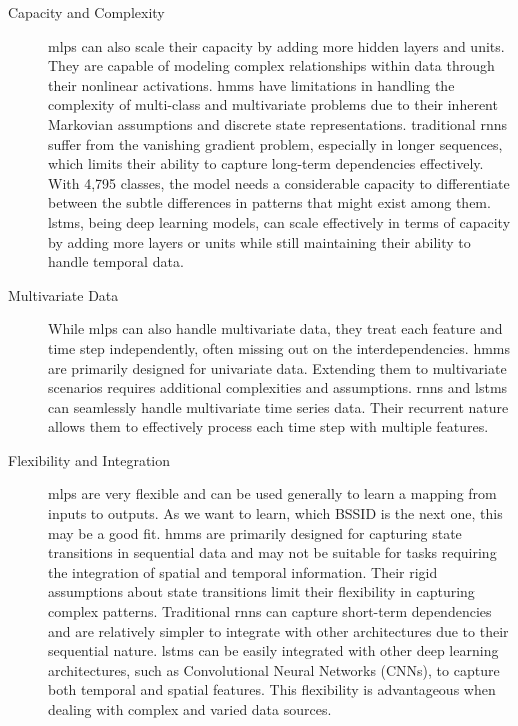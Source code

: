 \begin{description}
\item[Capacity and Complexity]
\acp{mlp} can also scale their capacity by adding more hidden layers and units. They are capable of modeling complex relationships within data through their nonlinear activations.
\acp{hmm} have limitations in handling the complexity of multi-class and multivariate problems due to their inherent Markovian assumptions and discrete state representations.
traditional \acp{rnn} suffer from the vanishing gradient problem, especially in longer sequences, which limits their ability to capture long-term dependencies effectively. \cite{rnn_difficulties_2013}
With 4,795 classes, the model needs a considerable capacity to differentiate between the subtle differences in patterns that might exist among them. \acp{lstm}, being deep learning models, can scale effectively in terms of capacity by adding more layers or units while still maintaining their ability to handle temporal data.
\end{description}

\begin{description}
\item [Multivariate Data]
While \acp{mlp} can also handle multivariate data, they treat each feature and time step independently, often missing out on the interdependencies.
\acp{hmm} are primarily designed for univariate data. Extending them to multivariate scenarios requires additional complexities and assumptions.
\acp{rnn} and \acp{lstm} can seamlessly handle multivariate time series data. Their recurrent nature allows them to effectively process each time step with multiple features.
\end{description}

\begin{description}
\item[Flexibility and Integration]
\acp{mlp} are very flexible and can be used generally to learn a mapping from inputs to outputs. \cite{mlp-vs-cnn-vs-rnn} As we want to learn, which BSSID is the next one, this may be a good fit.
\acp{hmm} are primarily designed for capturing state transitions in sequential data and may not be suitable for tasks requiring the integration of spatial and temporal information. Their rigid assumptions about state transitions limit their flexibility in capturing complex patterns. \cite{hmm-rabiner-1989}
Traditional \acp{rnn} can capture short-term dependencies and are relatively simpler to integrate with other architectures due to their sequential nature.
\acp{lstm} can be easily integrated with other deep learning architectures, such as Convolutional Neural Networks (CNNs), to capture both temporal and spatial features. This flexibility is advantageous when dealing with complex and varied data sources.
\end{description}

